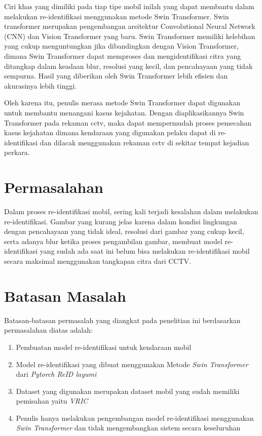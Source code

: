 Ciri khas yang dimiliki pada tiap tipe mobil inilah yang dapat membantu dalam melakukan 
re-identifikasi menggunakan metode Swin Transformer. Swin transformer merupakan 
pengembangan arsitektur Convolutional Neural Network (CNN) dan Vision Transformer yang 
baru. Swin Transformer memiliki kelebihan yang cukup menguntungkan jika dibandingkan 
dengan Vision Transformer, dimana Swin Transformer dapat memproses dan mengidentifikasi 
citra yang ditangkap dalam keadaan blur, resolusi yang kecil, dan pencahayaan yang tidak 
sempurna. Hasil yang diberikan oleh Swin Transformer lebih efisien dan akurasinya lebih tinggi.

Oleh karena itu, penulis merasa metode Swin Transformer dapat digunakan untuk membantu menangani 
kasus kejahatan. Dengan diaplikasikannya Swin Transformer pada rekaman cctv, maka dapat mempermudah 
proses pemecahan kasus kejahatan dimana kendaraan yang digunakan pelaku dapat di re-identifikasi 
dan dilacak menggunakan rekaman cctv di sekitar tempat kejadian perkara.

\section{Permasalahan}
\label{sec:permasalahan}

Dalam proses re-identifikasi mobil, sering kali terjadi kesalahan dalam melakukan re-identifikasi.
Gambar yang kurang jelas karena dalam kondisi lingkungan dengan pencahayaan yang tidak ideal,
resolusi dari gambar yang cukup kecil, serta adanya blur ketika proses pengambilan gambar, membuat model re-identifikasi
yang sudah ada saat ini belum bisa melakukan re-identifikasi mobil secara maksimal menggunakan 
tangkapan citra dari CCTV.

\section{Batasan Masalah}
\label{sec:batasanmasalah}

Batasan-batasan permasalah yang diangkat pada penelitian ini berdasarkan permasalahan diatas adalah:

\begin{enumerate}[nolistsep]

      \item Pembuatan model re-identifikasi untuk kendaraan mobil

      \item Model re-identifikasi yang dibuat menggunakan Metode \emph{Swin Transformer} dari \emph{Pytorch 
      ReID layumi} 

      \item Dataset yang digunakan merupakan dataset mobil yang sudah memiliki pemisahan yaitu \emph{VRIC}

      \item Penulis hanya melakukan pengembangan model re-identifikasi menggunakan \emph{Swin Transformer} dan tidak 
      mengembangkan sistem secara keseluruhan

\end{enumerate}

